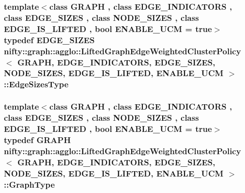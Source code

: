 \subsubsection[{Edge\+Sizes\+Type}]{\setlength{\rightskip}{0pt plus 5cm}template$<$class G\+R\+A\+P\+H , class E\+D\+G\+E\+\_\+\+I\+N\+D\+I\+C\+A\+T\+O\+R\+S , class E\+D\+G\+E\+\_\+\+S\+I\+Z\+E\+S , class N\+O\+D\+E\+\_\+\+S\+I\+Z\+E\+S , class E\+D\+G\+E\+\_\+\+I\+S\+\_\+\+L\+I\+F\+T\+E\+D , bool E\+N\+A\+B\+L\+E\+\_\+\+U\+C\+M = true$>$ typedef E\+D\+G\+E\+\_\+\+S\+I\+Z\+E\+S {\bf nifty\+::graph\+::agglo\+::\+Lifted\+Graph\+Edge\+Weighted\+Cluster\+Policy}$<$ G\+R\+A\+P\+H, E\+D\+G\+E\+\_\+\+I\+N\+D\+I\+C\+A\+T\+O\+R\+S, E\+D\+G\+E\+\_\+\+S\+I\+Z\+E\+S, N\+O\+D\+E\+\_\+\+S\+I\+Z\+E\+S, E\+D\+G\+E\+\_\+\+I\+S\+\_\+\+L\+I\+F\+T\+E\+D, E\+N\+A\+B\+L\+E\+\_\+\+U\+C\+M $>$\+::{\bf Edge\+Sizes\+Type}}\label{classnifty_1_1graph_1_1agglo_1_1LiftedGraphEdgeWeightedClusterPolicy_ad63cc4f759cd05f1bf9b7fec48629221}
\hypertarget{classnifty_1_1graph_1_1agglo_1_1LiftedGraphEdgeWeightedClusterPolicy_ae3d069ea1fd066a37e1c816c0bf50b83}{}
\subsubsection[{Graph\+Type}]{\setlength{\rightskip}{0pt plus 5cm}template$<$class G\+R\+A\+P\+H , class E\+D\+G\+E\+\_\+\+I\+N\+D\+I\+C\+A\+T\+O\+R\+S , class E\+D\+G\+E\+\_\+\+S\+I\+Z\+E\+S , class N\+O\+D\+E\+\_\+\+S\+I\+Z\+E\+S , class E\+D\+G\+E\+\_\+\+I\+S\+\_\+\+L\+I\+F\+T\+E\+D , bool E\+N\+A\+B\+L\+E\+\_\+\+U\+C\+M = true$>$ typedef G\+R\+A\+P\+H {\bf nifty\+::graph\+::agglo\+::\+Lifted\+Graph\+Edge\+Weighted\+Cluster\+Policy}$<$ G\+R\+A\+P\+H, E\+D\+G\+E\+\_\+\+I\+N\+D\+I\+C\+A\+T\+O\+R\+S, E\+D\+G\+E\+\_\+\+S\+I\+Z\+E\+S, N\+O\+D\+E\+\_\+\+S\+I\+Z\+E\+S, E\+D\+G\+E\+\_\+\+I\+S\+\_\+\+L\+I\+F\+T\+E\+D, E\+N\+A\+B\+L\+E\+\_\+\+U\+C\+M $>$\+::{\bf Graph\+Type}}\label{classnifty_1_1graph_1_1agglo_1_1LiftedGraphEdgeWeightedClusterPolicy_ae3d069ea1fd066a37e1c816c0bf50b83}
\hypertarget{classnifty_1_1graph_1_1agglo_1_1LiftedGraphEdgeWeightedClusterPolicy_a83ef319d77186be2fc3957ed06f0a8f1}{}

